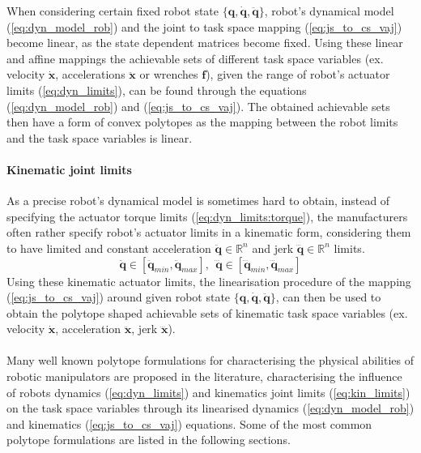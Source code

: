 When considering certain fixed robot state $\{\bm{q},\dot{\bm{q}},\ddot{\bm{q}}\}$, robot's dynamical model (\ref{eq:dyn_model_rob}) and the joint to task space mapping (\ref{eq:js_to_cs_vaj}) become linear, as the state dependent matrices become fixed. Using these linear and affine mappings the achievable sets of different task space variables (ex. velocity $\dot{\bm{x}}$, accelerations $\ddot{\bm{x}}$ or wrenches $\bm{f}$), given the range of robot's actuator limits (\ref{eq:dyn_limits}), can be found through the equations (\ref{eq:dyn_model_rob}) and (\ref{eq:js_to_cs_vaj}). The obtained achievable sets then have a form of convex polytopes as the mapping between the robot limits and the task space variables is linear.


\paragraph*{Kinematic joint limits} As a precise robot's dynamical model is sometimes hard to obtain, instead of specifying the actuator torque limits (\ref{eq:dyn_limits:torque}), the manufacturers often rather specify robot's actuator limits in a kinematic form, considering them to have limited and constant acceleration $\ddot{\bm{q}} \in \mathbb{R}^n$ and jerk $\dddot{\bm{q}} \in \mathbb{R}^n$ limits.
\begin{equation}
\ddot{\bm{q}} \in [\ddot{\bm{q}}_{min}, \ddot{\bm{q}}_{max}], ~~ \dddot{\bm{q}} \in [ \dddot{\bm{q}}_{min}, \dddot{\bm{q}}_{max}] 
\label{eq:kin_limits}
\end{equation}
Using these kinematic actuator limits, the linearisation procedure of the mapping (\ref{eq:js_to_cs_vaj}) around given robot state $\{\bm{q},\dot{\bm{q}},\ddot{\bm{q}}\}$, can then be used to obtain the polytope shaped achievable sets of kinematic task space variables (ex. velocity $\dot{\bm{x}}$, acceleration $\ddot{\bm{x}}$, jerk $\dddot{\bm{x}}$).



\paragraph*{} Many well known polytope formulations for characterising the physical abilities of robotic manipulators are proposed in the literature, characterising the influence of robots dynamics (\ref{eq:dyn_limits}) and kinematics joint limits (\ref{eq:kin_limits}) on the task space variables through its linearised dynamics (\ref{eq:dyn_model_rob}) and kinematics (\ref{eq:js_to_cs_vaj}) equations. Some of the most common polytope formulations are listed in the following sections.

